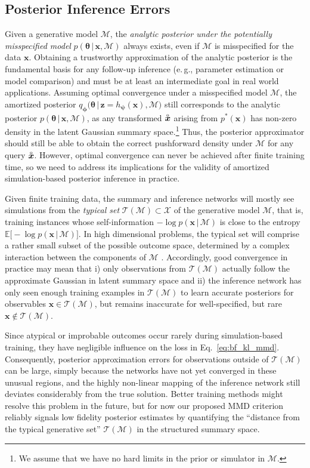 \documentclass[twoside,11pt]{article}
\newcommand{\observed}[1]{\protect\accentset{\text{o}}{#1}}%
\newcommand{\x}{\boldsymbol{x}}
\newcommand{\z}{\boldsymbol{z}}
\newcommand{\thetab}{\boldsymbol{\theta}}
\newcommand{\phib}{\boldsymbol{\phi}}
\newcommand{\psib}{\boldsymbol{\psi}}
\newcommand{\0}{\boldsymbol{0}}
\newcommand{\given}{\,|\,}
\newcommand{\M}{\mathcal{M}}
\newcommand{\eg}{e.\,g.}
\begin{document}
\subsection{Posterior Inference Errors}\label{sec:posterior-inference-errors}

Given a generative model $\mathcal{M}$, the \emph{analytic posterior under the potentially misspecified model} $p(\thetab \given \x,\mathcal{M})$ always exists, even if $\mathcal{M}$ is misspecified for the data $\x$.
Obtaining a trustworthy approximation of the analytic posterior is the fundamental basis for any follow-up inference (\eg, parameter estimation or model comparison) and must be at least an intermediate goal in real world applications.
Assuming optimal convergence under a misspecified model $\mathcal{M}$, the amortized posterior $q_{\phib}\big(\thetab \given \z = h_{\psib}(\x), \mathcal{M}\big)$ still corresponds to the analytic posterior $p(\thetab \given \x,\mathcal{M})$, as any transformed $\observed{\x}$ arising from $p^*(\x)$ has non-zero density in the latent Gaussian summary space.\footnote{We assume that we have no hard limits in the prior or simulator in $\M$.}
Thus, the posterior approximator should still be able to obtain the correct pushforward density under $\mathcal{M}$ for any query $\observed{\x}$.
However, optimal convergence can never be achieved after finite training time, so we need to address its implications for the validity of amortized simulation-based posterior inference in practice.

Given finite training data, the summary and inference networks will mostly see simulations from the \emph{typical set} $\mathcal{T}(\M) \subset \mathcal{X}$ of the generative model $\M$, that is, training instances whose self-information $-\log p(\x \given \mathcal{M})$ is close to the entropy $\mathbb{E}\big[-\log p(\x \given \mathcal{M})\big]$.
In high dimensional problems, the typical set will comprise a rather small subset of the possible outcome space, 
determined by a complex interaction between the components of $\M$ \citep{betancourt2017}.
Accordingly, good convergence in practice may mean that i) only observations from $\mathcal{T}(\M)$ actually follow the approximate Gaussian in latent summary space and ii) the inference network has only seen enough training examples in $\mathcal{T}(\M)$ to learn accurate posteriors for observables $\x \in \mathcal{T}(\M)$, but remains inaccurate for well-specified, but rare $\x\not\in\mathcal{T}(\M)$.

Since atypical or improbable outcomes occur rarely during simulation-based training, they have negligible influence on the loss in Eq.~\ref{eq:bf_kl_mmd}.
Consequently, posterior approximation errors for observations outside of $\mathcal{T}(\M)$ can be large, simply because the networks have not yet converged in these unusual regions, and the highly non-linear mapping of the inference network still deviates considerably from the true solution.
Better training methods might resolve this problem in the future, but for now our proposed MMD criterion reliably signals low fidelity posterior estimates by quantifying the ``distance from the typical generative set'' $\mathcal{T}(\M)$ in the structured summary space.
\end{document}
